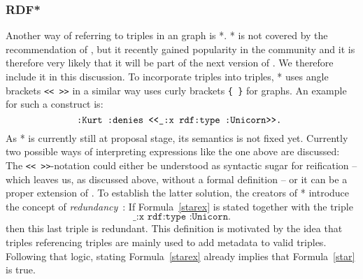 % 
% 

\subsubsection{RDF*}
Another way of referring to \rdf triples in an \rdf graph is \rdf{}*\cite{rdfstar,rdfstarposter}. \rdf{}* is not covered by the \wwwc recommendation of \rdf, 
but it recently gained popularity in the community and 
it is therefore very likely that it will be part of the next version of \rdf. We therefore include it in this discussion.
To incorporate triples into triples, \rdf{}* uses angle brackets \texttt{<{}<  >{}>} in a similar way \nthree uses curly brackets \texttt{\{ \}} for graphs. 
An example for such a construct is:
\begin{equation}\label{starex}
\verb!:Kurt :denies <<_:x rdf:type :Unicorn>>. !
\end{equation}
As \rdf{}* is currently still at proposal stage, 
its semantics is not fixed yet. Currently two possible ways of interpreting expressions like the one above are discussed:
% 
The 
\texttt{<{}<  >{}>}-notation could either  be understood as syntactic sugar for reification -- which leaves us, as discussed above, without a formal 
definition -- or it can be a proper extension of \rdf. 
To establish the latter solution, the creators of \rdf{}*  introduce the concept of \emph{redundancy}~\cite{rdfstar}: If Formula~\ref{starex} is stated together with the \rdf triple
\begin{equation}\label{star}
 \texttt{\_:x rdf:type :Unicorn.}
\end{equation}
then this last triple is redundant. This definition is motivated by the idea that triples referencing triples are mainly used to add metadata to valid triples. 
Following that logic, stating Formula~\ref{starex} already implies that Formula~\ref{star} is true. 

